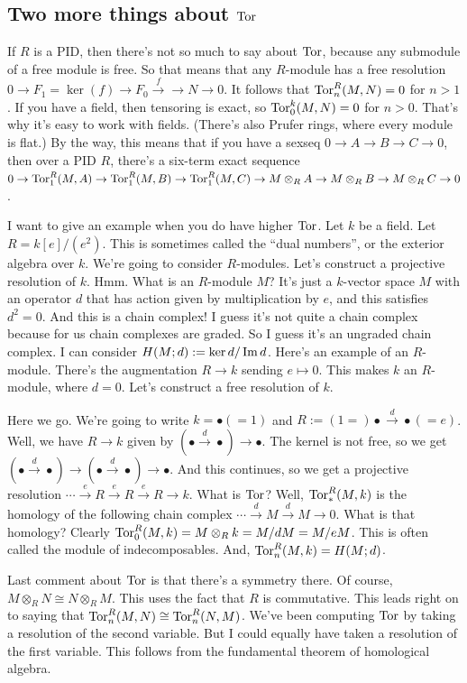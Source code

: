 \subsection{Two more things about $\operatorname{Tor}$}
If $R$ is a PID, then there's not so much to say about $\operatorname{Tor}$, because any submodule of a free module is free. So that means that any $R$-module has a free resolution $0\to F_1=\ker(f)\to F_0\xrightarrow{f}\to N\to 0$. It follows that $\operatorname{Tor}^R_n(M,N)=0$ for $n>1$. If you have a field, then tensoring is exact, so $\operatorname{Tor}^k_0(M,N)=0$ for $n>0$. That's why it's easy to work with fields. (There's also Prufer rings, where every module is flat.) By the way, this means that if you have a sexseq $0\to A\to B\to C\to 0$, then over a PID $R$, there's a six-term exact sequence $0\to\operatorname{Tor}^R_1(M,A)\to \operatorname{Tor}^R_1(M,B)\to \operatorname{Tor}^R_1(M,C)\to M\otimes_R A\to M\otimes_R B\to M\otimes_R C\to 0$.
\begin{example}
I want to give an example when you do have higher $\operatorname{Tor}$. Let $k$ be a field. Let $R=k[e]/(e^2)$. This is sometimes called the ``dual numbers'', or the exterior algebra over $k$. We're going to consider $R$-modules. Let's construct a projective resolution of $k$. Hmm. What is an $R$-module $M$? It's just a $k$-vector space $M$ with an operator $d$ that has action given by multiplication by $e$, and this satisfies $d^2=0$. And this is a chain complex! I guess it's not quite a chain complex because for us chain complexes are graded. So I guess it's an ungraded chain complex. I can consider $ H(M;d):=\ker d/\operatorname{Im} d$. Here's an example of an $R$-module. There's the augmentation $R\to k$ sending $e\mapsto 0$. This makes $k$ an $R$-module, where $d=0$. Let's construct a free resolution of $k$.

Here we go. We're going to write $k=\bullet(=1)$ and $R:=(1=)\bullet\xrightarrow{d}\bullet(=e)$. Well, we have $R\to k$ given by $(\bullet\xrightarrow{d}\bullet)\to \bullet$. The kernel is not free, so we get $(\bullet\xrightarrow{d}\bullet)\to (\bullet\xrightarrow{d}\bullet)\to \bullet$. And this continues, so we get a projective resolution $\cdots\xrightarrow{e} R\xrightarrow{e} R\xrightarrow{e} R\to k$. What is $\operatorname{Tor}$? Well, $\operatorname{Tor}^R_\ast(M,k)$ is the homology of the following chain complex $\cdots\xrightarrow{d} M\xrightarrow{d} M\to 0$. What is that homology? Clearly $\operatorname{Tor}^R_0(M,k)=M\otimes_R k=M/dM=M/eM$. This is often called the module of indecomposables. And, $\operatorname{Tor}^R_n(M,k)= H(M;d)$.
\end{example}
Last comment about $\operatorname{Tor}$ is that there's a symmetry there. Of course, $M\otimes_R N\cong N\otimes_R M$. This uses the fact that $R$ is commutative. This leads right on to saying that $\operatorname{Tor}^R_n(M,N)\cong \operatorname{Tor}^R_n(N,M)$. We've been computing $\operatorname{Tor}$ by taking a resolution of the second variable. But I could equally have taken a resolution of the first variable. This follows from the fundamental theorem of homological algebra.
